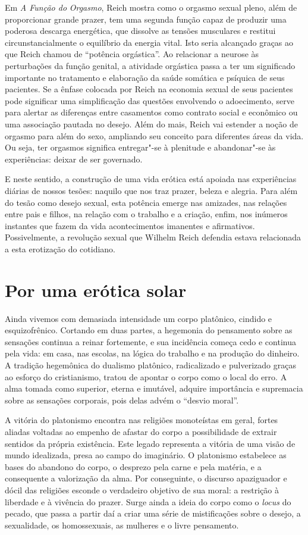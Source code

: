 Em \emph{A Função do} \emph{Orgasmo}, Reich mostra como o orgasmo sexual
pleno, além de proporcionar grande prazer, tem uma segunda função capaz
de produzir uma poderosa descarga energética, que dissolve as tensões
musculares e restitui circunstancialmente o equilíbrio da energia vital.
Isto seria alcançado graças ao que Reich chamou de ``potência
orgástica''. Ao relacionar a neurose às perturbações da função genital,
a atividade orgástica passa a ter um significado importante no
tratamento e elaboração da saúde somática e psíquica de seus pacientes.
Se a ênfase colocada por Reich na economia sexual de seus pacientes pode
significar uma simplificação das questões envolvendo o adoecimento,
serve para alertar as diferenças entre casamentos como contrato social e
econômico ou uma associação pautada no desejo. Além do mais, Reich vai
estender a noção de orgasmo para além do sexo, ampliando seu conceito
para diferentes áreas da vida. Ou seja, ter orgasmos significa
entregar"-se à plenitude e abandonar"-se às experiências: deixar de ser
governado.

E neste sentido, a construção de uma vida erótica está apoiada nas
experiências diárias de nossos tesões: naquilo que nos traz prazer,
beleza e alegria. Para além do tesão como desejo sexual, esta potência
emerge nas amizades, nas relações entre pais e filhos, na relação com o
trabalho e a criação, enfim, nos inúmeros instantes que fazem da vida
acontecimentos imanentes e afirmativos. Possivelmente, a revolução
sexual que Wilhelm Reich defendia estava relacionada a esta erotização
do cotidiano.

\section{Por uma erótica solar}

Ainda vivemos com demasiada intensidade um corpo platônico, cindido e
esquizofrênico. Cortando em duas partes, a hegemonia do pensamento sobre
as sensações continua a reinar fortemente, e sua incidência começa cedo
e continua pela vida: em casa, nas escolas, na lógica do trabalho e na
produção do dinheiro. A tradição hegemônica do dualismo platônico,
radicalizado e pulverizado graças ao esforço do cristianismo, tratou de
apontar o corpo como o local do erro. A alma tomada como superior,
eterna e imutável, adquire importância e supremacia sobre as sensações
corporais, pois delas advém o ``desvio moral''.

A vitória do platonismo encontra nas religiões monoteístas em geral,
fortes aliadas voltadas ao empenho de afastar do corpo a possibilidade
de extrair sentidos da própria existência. Este legado representa a
vitória de uma visão de mundo idealizada, presa ao campo do imaginário.
O platonismo estabelece as bases do abandono do corpo, o desprezo pela
carne e pela matéria, e a consequente a valorização da alma. Por
conseguinte, o discurso apaziguador e dócil das religiões esconde o
verdadeiro objetivo de sua moral: a restrição à liberdade e à vivência
do prazer. Surge ainda a ideia do corpo como o \emph{locus} do pecado,
que passa a partir daí a criar uma série de mistificações sobre o
desejo, a sexualidade, os homossexuais, as mulheres e o livre
pensamento.

